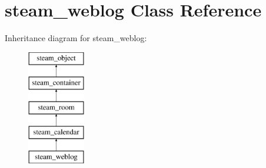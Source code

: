 \hypertarget{classsteam__weblog}{
\section{steam\_\-weblog Class Reference}
\label{classsteam__weblog}
}
Inheritance diagram for steam\_\-weblog:\begin{figure}[H]
\begin{center}
\leavevmode
\includegraphics[height=5.000000cm]{classsteam__weblog}
\end{center}
\end{figure}
